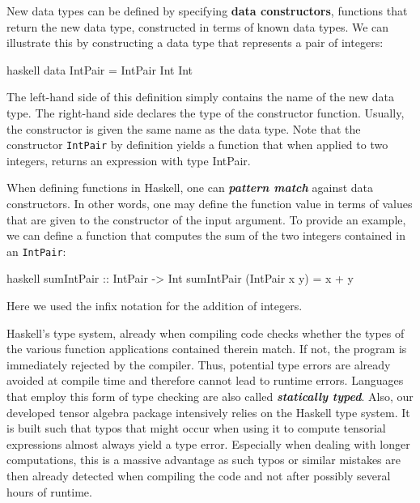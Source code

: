 New data types can be defined by specifying \textbf{\textbf{data constructors}}, functions that  return the new data type, constructed in terms of known data types. We can illustrate this by constructing a data type that represents a pair of integers:
\begin{center}
\begin{cminted}{haskell}
data IntPair = IntPair Int Int 
\end{cminted}
\end{center}
The left-hand side of this definition simply contains the name of the new data type. The right-hand side declares the type of the constructor function. Usually, the constructor is given the same name as the data type. 
Note that the constructor \texttt{IntPair} by definition yields a function that when applied to two integers, returns an expression with type IntPair. 

When defining functions in Haskell, one can \textbf{\textit{pattern match}} against data constructors. In other words, one may define the function value in terms of values that are given to the constructor of the input argument. To provide an example, we can define a function that computes the sum of the two integers contained in an \texttt{IntPair}:
\begin{center}
\begin{cminted}{haskell}
sumIntPair :: IntPair -> Int 
sumIntPair (IntPair x y) = x + y
\end{cminted}
\end{center}
Here we used the infix notation for the addition of integers. 

Haskell's type system, already when compiling code checks whether the types of the various function applications contained therein match. If not, the program is immediately rejected by the compiler. Thus, potential type errors are already avoided at compile time and therefore cannot lead to runtime errors. Languages that employ this form of type checking are also called \textit{\textbf{statically typed}}. Also, our developed tensor algebra package intensively relies on the Haskell type system. It is built such that typos that might occur when using it to compute tensorial expressions almost always yield a type error. Especially when dealing with longer computations, this is a massive advantage as such typos or similar mistakes are then already detected when compiling the code and not after possibly several hours of runtime.  

